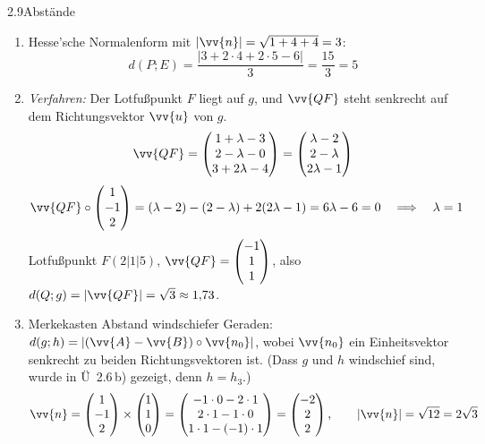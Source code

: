 \begin{loesung}{2.9}{Abstände}
\begin{enumerate}[label=\alph*)]
  \item Hesse'sche Normalenform mit $|\vv{n}| = \sqrt{1+4+4} = 3$:
  \[d(P;E) = \dfrac{|3+2\cdot 4+2\cdot 5-6|}{3} = \dfrac{15}{3} = 5\]
  \item \textit{Verfahren:} Der Lotfußpunkt $F$ liegt auf $g$, und $\vv{QF}$ steht senkrecht auf dem Richtungsvektor $\vv{u}$ von $g$.
  \[\vv{QF} = \begin{pmatrix} 1+\lambda-3\\ 2-\lambda-0\\ 3+2\lambda-4\end{pmatrix} = \begin{pmatrix} \lambda-2\\ 2-\lambda\\ 2\lambda-1\end{pmatrix}\]
  \[\vv{QF}\circ\begin{pmatrix} 1\\ -1\\ 2\end{pmatrix} = (\lambda-2)-(2-\lambda)+2(2\lambda-1) = 6\lambda-6 = 0\quad\Longrightarrow\quad\lambda = 1\]
  Lotfußpunkt $F(2|1|5)$, $\vv{QF} = \begin{pmatrix} -1\\ 1\\ 1\end{pmatrix}$, also $d(Q;g) = |\vv{QF}| = \sqrt{3}\approx 1{,}73$.
  \item Merkekasten \glqq Abstand windschiefer Geraden\grqq{}: $d(g;h) = \left|(\vv{A}-\vv{B})\circ\vv{n_0}\right|$, wobei $\vv{n_0}$ ein Einheitsvektor senkrecht zu beiden Richtungsvektoren ist. (Dass $g$ und $h$ windschief sind, wurde in Ü~2.6\,b) gezeigt, denn $h=h_3$.)
  \[\vv{n} = \begin{pmatrix} 1\\ -1\\ 2\end{pmatrix}\times\begin{pmatrix} 1\\ 1\\ 0\end{pmatrix} = \begin{pmatrix} -1\cdot 0-2\cdot 1\\ 2\cdot 1-1\cdot 0\\ 1\cdot 1-(-1)\cdot 1\end{pmatrix} = \begin{pmatrix} -2\\ 2\\ 2\end{pmatrix},\qquad |\vv{n}| = \sqrt{12} = 2\sqrt{3}\]

\end{enumerate}
\end{loesung}
